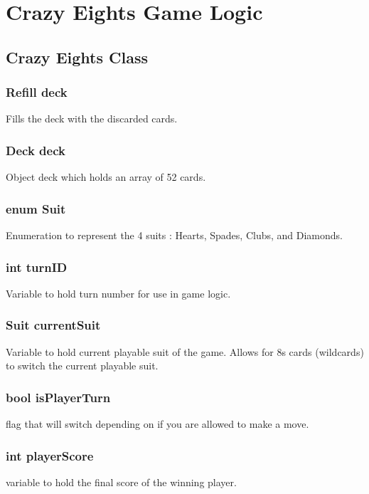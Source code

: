 \section
{
  Crazy Eights Game Logic
}

\subsection
{
  Crazy Eights Class
}

\subsubsection
{
  Refill deck
}
Fills the deck with the discarded cards.

\subsubsection
{
  Deck deck
}
Object deck which holds an array of 52 cards.

\subsubsection
{
  enum Suit
}
Enumeration to represent the 4 suits : Hearts,
                                       Spades,
                                       Clubs,
                                       and Diamonds.

\subsubsection
{
  int turnID
}
    Variable to hold turn number for use in game logic.

\subsubsection
    {
      Suit currentSuit
    }
    Variable to hold current playable suit of the game.  Allows for 8s cards (wildcards) to switch the current playable suit.
    
\subsubsection
    {
      bool isPlayerTurn
    }
    flag that will switch depending on if you are allowed to make a move.

\subsubsection
    {
      int playerScore
    }
    variable to hold the final score of the winning player.
    
